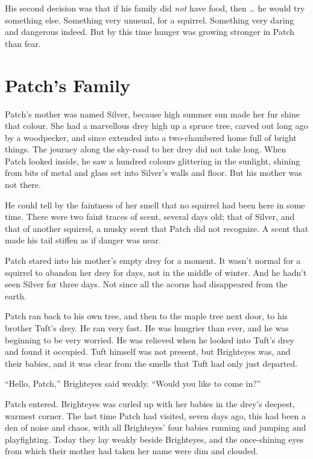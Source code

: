 \documentclass[ebook,oneside,openany,12pt]{memoir}
\begin{document}
His second decision was that if his family did \emph{not} have food,
then … he would try something else. Something very unusual, for a
squirrel. Something very daring and dangerous indeed. But by this time
hunger was growing stronger in Patch than fear.


\section{Patch’s Family}

Patch’s mother was named Silver, because high summer sun made her fur
shine that colour. She had a marvellous drey high up a spruce tree,
carved out long ago by a woodpecker, and since extended into a
two-chambered home full of bright things. The journey along the
sky-road to her drey did not take long. When Patch looked inside, he
saw a hundred colours glittering in the sunlight, shining from bits of
metal and glass set into Silver’s walls and floor. But his mother was
not there.

He could tell by the faintness of her smell that no squirrel had been
here in some time. There were two faint traces of scent, several days
old; that of Silver, and that of another squirrel, a musky scent that
Patch did not recognize. A scent that made his tail stiffen as if
danger was near.

Patch stared into his mother’s empty drey for a moment. It wasn’t
normal for a squirrel to abandon her drey for days, not in the middle
of winter. And he hadn’t seen Silver for three days. Not since all the
acorns had disappeared from the earth.

Patch ran back to his own tree, and then to the maple tree next door,
to his brother Tuft’s drey. He ran very fast. He was hungrier than
ever, and he was beginning to be very worried. He was relieved when he
looked into Tuft’s drey and found it occupied. Tuft himself was not
present, but Brighteyes was, and their babies, and it was clear from
the smells that Tuft had only just departed.

“Hello, Patch,” Brighteyes said weakly. “Would you like to come in?”

Patch entered. Brighteyes was curled up with her babies in the drey’s
deepest, warmest corner. The last time Patch had visited, seven days
ago, this had been a den of noise and chaos, with all Brighteyes’ four
babies running and jumping and playfighting. Today they lay weakly
beside Brighteyes, and the once-shining eyes from which their mother
had taken her name were dim and clouded.
\end{document}
